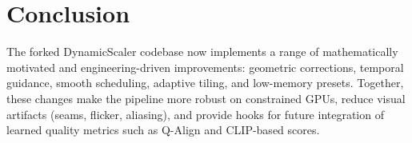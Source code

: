 \documentclass[11pt,a4paper]{article}
\begin{document}
\section*{Conclusion}

The forked DynamicScaler codebase now implements a range of mathematically motivated and engineering-driven improvements:
geometric corrections, temporal guidance, smooth scheduling, adaptive tiling, and low-memory presets.
Together, these changes make the pipeline more robust on constrained GPUs, reduce visual artifacts (seams, flicker, aliasing), and provide hooks for future integration of learned quality metrics such as Q-Align and CLIP-based scores.
\end{document}
